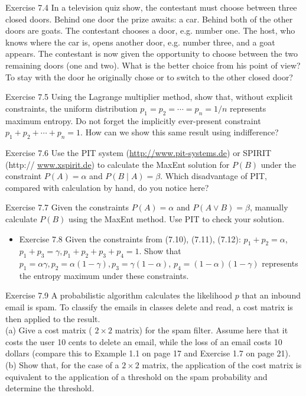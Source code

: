 \documentclass[10pt]{book}
\begin{document}
Exercise 7.4 In a television quiz show, the contestant must choose between three closed doors. Behind one door the prize awaits: a car. Behind both of the other doors are goats. The contestant chooses a door, e.g. number one. The host, who knows where the car is, opens another door, e.g. number three, and a goat appears. The contestant is now given the opportunity to choose between the two remaining doors (one and two). What is the better choice from his point of view? To stay with the door he originally chose or to switch to the other closed door?

Exercise 7.5 Using the Lagrange multiplier method, show that, without explicit constraints, the uniform distribution $p_{1}=p_{2}=\cdots=p_{n}=1 / n$ represents maximum entropy. Do not forget the implicitly ever-present constraint $p_{1}+p_{2}+\cdots+p_{n}=1$. How can we show this same result using indifference?

Exercise 7.6 Use the PIT system (\href{http://www.pit-systems.de}{http://www.pit-systems.de}) or SPIRIT (http:// \href{http://www.xspirit.de}{www.xspirit.de}) to calculate the MaxEnt solution for $P(B)$ under the constraint $P(A)=\alpha$ and $P(B \mid A)=\beta$. Which disadvantage of PIT, compared with calculation by hand, do you notice here?

Exercise 7.7 Given the constraints $P(A)=\alpha$ and $P(A \vee B)=\beta$, manually calculate $P(B)$ using the MaxEnt method. Use PIT to check your solution.

\begin{itemize}
  \item Exercise 7.8 Given the constraints from (7.10), (7.11), (7.12): $p_{1}+p_{2}=\alpha$, $p_{1}+p_{3}=\gamma, p_{1}+p_{2}+p_{3}+p_{4}=1$. Show that $p_{1}=\alpha \gamma, p_{2}=\alpha(1-\gamma), p_{3}=\gamma(1-\alpha)$, $p_{4}=(1-\alpha)(1-\gamma)$ represents the entropy maximum under these constraints.
\end{itemize}


Exercise 7.9 A probabilistic algorithm calculates the likelihood $p$ that an inbound email is spam. To classify the emails in classes delete and read, a cost matrix is then applied to the result.\\
(a) Give a cost matrix ( $2 \times 2$ matrix) for the spam filter. Assume here that it costs the user 10 cents to delete an email, while the loss of an email costs 10 dollars (compare this to Example 1.1 on page 17 and Exercise 1.7 on page 21).\\
(b) Show that, for the case of a $2 \times 2$ matrix, the application of the cost matrix is equivalent to the application of a threshold on the spam probability and determine the threshold.
\end{document}
